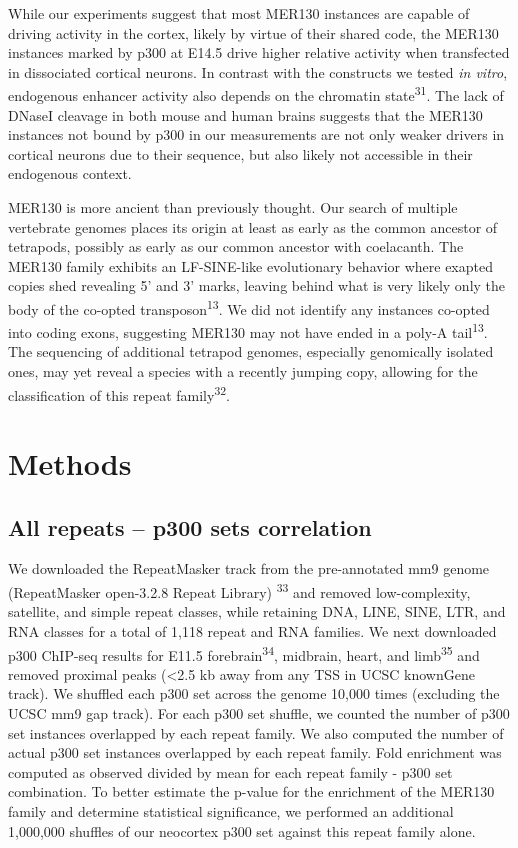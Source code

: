 \documentclass[]{article}
\begin{document}
While our experiments suggest that most MER130 instances are capable of
driving activity in the cortex, likely by virtue of their shared code,
the MER130 instances marked by p300 at E14.5 drive higher relative
activity when transfected in dissociated cortical neurons. In contrast
with the constructs we tested \emph{in vitro}, endogenous enhancer
activity also depends on the chromatin state\textsuperscript{31}. The
lack of DNaseI cleavage in both mouse and human brains suggests that the
MER130 instances not bound by p300 in our measurements are not only
weaker drivers in cortical neurons due to their sequence, but also
likely not accessible in their endogenous context.

MER130 is more ancient than previously thought. Our search of multiple
vertebrate genomes places its origin at least as early as the common
ancestor of tetrapods, possibly as early as our common ancestor with
coelacanth. The MER130 family exhibits an LF-SINE-like evolutionary
behavior where exapted copies shed revealing 5' and 3' marks, leaving
behind what is very likely only the body of the co-opted
transposon\textsuperscript{13}. We did not identify any instances
co-opted into coding exons, suggesting MER130 may not have ended in a
poly-A tail\textsuperscript{13}. The sequencing of additional tetrapod
genomes, especially genomically isolated ones, may yet reveal a species
with a recently jumping copy, allowing for the classification of this
repeat family\textsuperscript{32}.

\section{Methods}\label{methods}

\subsection{All repeats -- p300 sets
correlation}\label{all-repeats-p300-sets-correlation}

We downloaded the RepeatMasker track from the pre-annotated mm9 genome
(RepeatMasker open-3.2.8 Repeat Library) \textsuperscript{33} and
removed low-complexity, satellite, and simple repeat classes, while
retaining DNA, LINE, SINE, LTR, and RNA classes for a total of 1,118
repeat and RNA families. We next downloaded p300 ChIP-seq results for
E11.5 forebrain\textsuperscript{34}, midbrain, heart, and
limb\textsuperscript{35} and removed proximal peaks (\textless{}2.5 kb
away from any TSS in UCSC knownGene track). We shuffled each p300 set
across the genome 10,000 times (excluding the UCSC mm9 gap track). For
each p300 set shuffle, we counted the number of p300 set instances
overlapped by each repeat family. We also computed the number of actual
p300 set instances overlapped by each repeat family. Fold enrichment was
computed as observed divided by mean for each repeat family - p300 set
combination. To better estimate the p-value for the enrichment of the
MER130 family and determine statistical significance, we performed an
additional 1,000,000 shuffles of our neocortex p300 set against this
repeat family alone.
\end{document}
